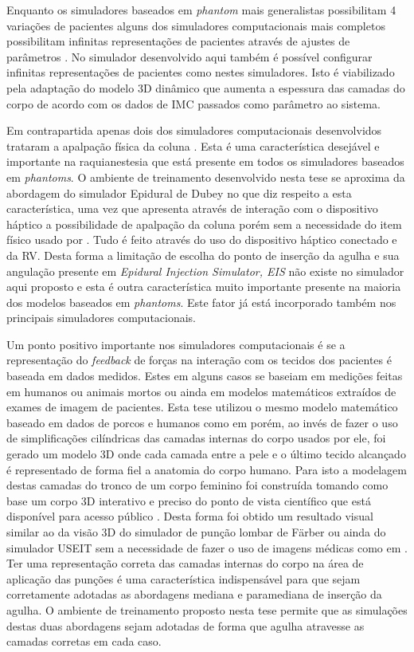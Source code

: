 Enquanto os simuladores baseados em \textit{phantom} mais generalistas possibilitam 4 variações de pacientes alguns dos simuladores computacionais mais completos possibilitam infinitas representações de pacientes através de ajustes de parâmetros \cite{Stredney1996, Wilson2003, N.2013, Brazil2017}. No simulador desenvolvido aqui também é possível configurar infinitas representações de pacientes como nestes simuladores. Isto é viabilizado pela adaptação do modelo 3D dinâmico que aumenta a espessura das camadas do corpo de acordo com os dados de \acrshort{IMC} passados como parâmetro ao sistema.  

Em contrapartida apenas dois dos simuladores computacionais desenvolvidos trataram a apalpação física da coluna \cite{Wilson2003, N.2013}. Esta é uma característica desejável e importante na raquianestesia que está presente em todos os simuladores baseados em \textit{phantoms}. O ambiente de treinamento desenvolvido nesta tese se aproxima da abordagem do simulador Epidural de Dubey \cite{N.2013} no que diz respeito a esta característica, uma vez que apresenta através de interação com o dispositivo háptico a possibilidade de apalpação da coluna porém sem a necessidade do item físico usado por \textcite{Wilson2003}. Tudo é feito através do uso do dispositivo háptico conectado e da \acrshort{RV}. Desta forma a limitação de escolha do ponto de inserção da agulha e sua angulação presente em \textit{Epidural Injection Simulator, EIS} \cite{Wilson2003} não existe no simulador aqui proposto e esta é outra característica muito importante presente na maioria dos modelos baseados em \textit{phantoms}. Este fator já está incorporado também nos principais simuladores computacionais.

Um ponto positivo importante nos simuladores computacionais é se a representação do \textit{feedback} de forças na interação com os tecidos dos pacientes é baseada em dados medidos. Estes em alguns casos se baseiam em medições feitas em humanos ou animais mortos ou ainda em modelos matemáticos extraídos de exames de imagem de pacientes. Esta tese utilizou o mesmo modelo matemático baseado em dados de porcos e humanos como em \textcite{Brazil2017} porém, ao invés de fazer o uso de simplificações cilíndricas das camadas internas do corpo usados por ele, foi gerado um modelo 3D onde cada camada entre a pele e o último tecido alcançado é representado de forma fiel a anatomia do corpo humano. Para isto a modelagem destas camadas do tronco de um corpo feminino foi construída tomando como base um corpo 3D interativo e preciso do ponto de vista científico que está disponível para acesso público \cite{BioDigitalInc2019}. Desta forma foi obtido um resultado visual similar ao da visão 3D do simulador de punção lombar de Färber ou ainda do simulador USEIT sem a necessidade de fazer o uso de imagens médicas como em \textcite{Farber2009}. Ter uma representação correta das camadas internas do corpo na área de aplicação das punções é uma característica indispensável para que sejam corretamente adotadas as abordagens mediana e paramediana de inserção da agulha. O ambiente de treinamento proposto nesta tese permite que as simulações destas duas abordagens sejam adotadas de forma que agulha atravesse as camadas corretas em cada caso. 


